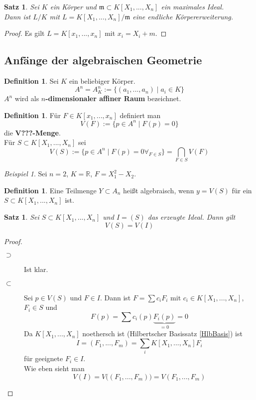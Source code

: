 \documentclass[10pt,a4paper]{article}
\newcommand{\R}{\ensuremath{\mathbb{R}}}
\theoremstyle{plain}
\newtheorem{satz}[theorem]{Satz}
\theoremstyle{definition}
\newtheorem{definition}[theorem]{Definition}
\theoremstyle{remark}
\newtheorem{exm}[theorem]{Beispiel}
\begin{document}
	\begin{satz}
		Sei $K$ ein Körper und $\mathfrak m\subset K[X_1,...,X_n]$ ein maximales Ideal.\\
		Dann ist $L/K$ mit $L=K[X_1,...,X_n]/\mathfrak m$ eine endliche Körpererweiterung.
	\end{satz}
	\begin{proof}
		Es gilt $L=K[x_1,...,x_n]$ mit $x_i=X_i+m$.
	\end{proof}




	\subsection{Anfänge der algebraischen Geometrie}
	
	\begin{definition}
		Sei $K$ ein beliebiger Körper.
		\[A^n=A_K^n:=\{(a_1,...,a_n)\mid a_i\in K\}\]
		$A^n$ wird als \textbf{$n$-dimensionaler affiner Raum} bezeichnet.\\
	\end{definition}
	\begin{definition}
		Für $F\in K[x_1,...,x_n]$ definiert man
		\[V(F):=\{p\in A^n\mid F(p)=0\}\]
		die \textbf{V???-Menge}.\\ %
		Für $S\subset K[X_1,...,X_n]$ sei
		\[V(S):=\{p\in A^n\mid F(p)=0\forall_{F\in S}\}=\bigcap_{F\in S}V(F)\]
	\end{definition}

	\begin{exm}
		Sei $n=2$, $K=\R$, $F=X^2_1-X_2$.
	\end{exm}

	\begin{definition}
		Eine Teilmenge $Y\subset A_n$ heißt algebraisch, wenn $y=V(S)$ für ein $S\subset K[X_1,...,X_n]$ ist.
	\end{definition}

	\begin{satz}
		Sei $S\subset K[X_1,...,X_n]$ und $I=(S)$ das erzeugte Ideal. Dann gilt
		\[V(S)=V(I)\]
	\end{satz}
	\begin{proof}
		\begin{description}
			\item[$\supset$] Ist klar.
			\item[$\subset$] Sei $p\in V(S)$ und $F\in I$. Dann ist $F=\sum c_iF_i$ mit $c_i\in K[X_1,...,X_n]$, $F_i\in S$ und
			\[F(p)=\sum c_i(p)\underbrace{F_i(p)}_{=0}=0\]
			Da $K[X_1,...,X_n]$ noethersch ist (Hilbertscher Basissatz \ref{HlbBasis}) ist
			\[I=(F_1,...,F_m)=\sum_i K[X_1,...,X_n]F_i\]
			für geeignete $F_i\in I$.\\
			Wie eben sieht man 
			\[V(I)=V\big((F_1,...,F_m)\big)=V(F_1,...,F_m)\]
		\end{description}
	\end{proof}
	
\end{document}

